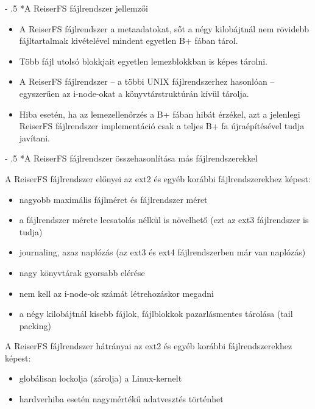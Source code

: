 \documentclass[tikz,12pt,margin=0px]{article}
\makeatletter
\renewcommand\paragraph{%
	\@startsection{paragraph}{4}{0mm}%
	{-\baselineskip}%
	{.5\baselineskip}%
	{\normalfont\normalsize\bfseries}}
\makeatother
\begin{document}
    \paragraph*{A ReiserFS fájlrendszer jellemzői\\}

    \begin{itemize}[topsep=8pt,itemsep=4pt,partopsep=4pt, parsep=4pt]
        \item A ReiserFS fájlrendszer a metaadatokat, sőt a négy kilobájtnál nem rövidebb fájltartalmak kivételével mindent egyetlen B+ fában tárol.\\
        \item Több fájl utolsó blokkjait egyetlen lemezblokkban is képes tárolni.\\
        \item A ReiserFS fájlrendszer – a többi UNIX fájlrendszerhez hasonlóan – egyszerűen az i-node-okat a könyvtárstruktúrán kívül tárolja.\\
        \item Hiba esetén, ha az lemezellenőrzés a B+ fában hibát érzékel, azt a jelenlegi ReiserFS fájlrendszer implementáció csak a teljes B+ fa újraépítésével tudja javítani.\\
    \end{itemize}

    \paragraph*{A ReiserFS fájlrendszer összehasonlítása más fájlrendszerekkel\\}

    \noindent A ReiserFS fájlrendszer előnyei az ext2 és egyéb korábbi fájlrendszerekhez képest:

    \begin{itemize}[topsep=8pt,itemsep=4pt,partopsep=4pt, parsep=4pt]
        \item nagyobb maximális fájlméret és fájlrendszer méret
        \item a fájlrendszer mérete lecsatolás nélkül is növelhető (ezt az ext3 fájlrendszer is tudja)
        \item journaling, azaz naplózás (az ext3 és ext4 fájlrendszerben már van naplózás)
        \item nagy könyvtárak gyorsabb elérése
        \item nem kell az i-node-ok számát létrehozáskor megadni
        \item a négy kilobájtnál kisebb fájlok, fájlblokkok pazarlásmentes tárolása (tail packing)
    \end{itemize}

    \noindent A ReiserFS fájlrendszer hátrányai az ext2 és egyéb korábbi fájlrendszerekhez képest:
    \begin{itemize}[topsep=8pt,itemsep=4pt,partopsep=4pt, parsep=4pt]
        \item globálisan lockolja (zárolja) a Linux-kernelt
        \item hardverhiba esetén nagymértékű adatvesztés történhet
    \end{itemize}
\end{document}
